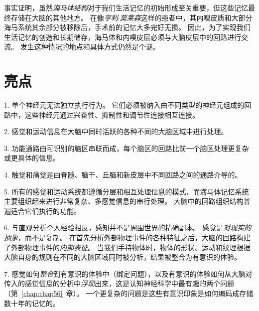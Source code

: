 事实证明，虽然\textit{海马体结构}对于我们生活记忆的初始形成至关重要，但这些记忆最终存储在大脑的其他地方。
在像\textit{亨利$\cdot$莫莱森}这样的患者中，其内嗅皮质和大部分海马系统其余部分被移除后，手术前的记忆大多完好无损。
因此，为了实现我们生活记忆的创造和长期储存，海马体和内嗅皮层必须与大脑皮层中的回路进行交流。
发生这种情况的地点和具体方式仍然是个谜。



\section{亮点}

1. 单个神经元无法独立执行行为。
它们必须被纳入由不同类型的神经元组成的回路中，这些神经元通过兴奋性、抑制性和调节性连接相互连接。


2. 感觉和运动信息在大脑中同时活跃的各种不同的大脑区域中进行处理。


3. 功能通路由可识别的脑区串联而成，每个脑区的回路比前一个脑区处理更复杂或更具体的信息。


4. 触觉和痛觉是由脊髓、脑干、丘脑和新皮层中不同回路之间的通路介导的。


5. 所有的感觉和运动系统都遵循分层和相互处理信息的模式，而海马体记忆系统主要组织起来进行非常复杂、多感觉信息的串行处理。
大脑中的回路组织结构普遍适合它们执行的功能。


6. 与直观分析个人经验相反，感知并不是周围世界的精确副本。
感觉是\textit{对现实的抽象}，而不是复制。
在首先分析外部物理事件的各种特征之后，大脑的回路构建了外部物理事件的\textit{内部表征}。
当我们手持物体时，物体的形状、运动和纹理根据大脑自身的规则在不同的大脑区域同时被分析，结果被整合为有意识的体验。


7. 感觉如何\textit{整合}到有意识的体验中（绑定问题），以及有意识的体验如何从大脑对传入的感觉信息的分析中\textit{浮现}出来，这是认知神经科学中最有趣的两个问题（第~\ref{chap:chap56}~章）。
一个更复杂的问题是这些有意识印象是如何编码成存储数十年的记忆的。
























